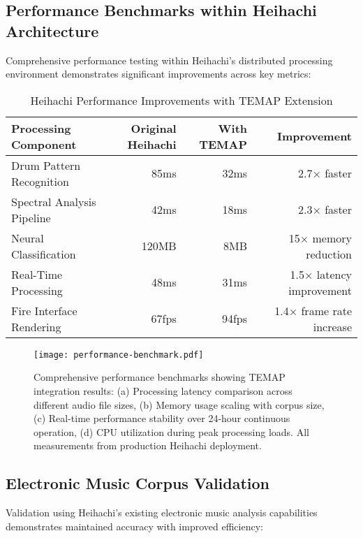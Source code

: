 \documentclass[12pt,a4paper]{article}
\begin{document}
\subsection{Performance Benchmarks within Heihachi Architecture}

Comprehensive performance testing within Heihachi's distributed processing environment demonstrates significant improvements across key metrics:

\begin{table}[ht]
\centering
\caption{Heihachi Performance Improvements with TEMAP Extension}
\begin{tabular}{@{}lrrr@{}}
\toprule
\textbf{Processing Component} & \textbf{Original Heihachi} & \textbf{With TEMAP} & \textbf{Improvement} \\
\midrule
Drum Pattern Recognition & 85ms & 32ms & 2.7× faster \\
Spectral Analysis Pipeline & 42ms & 18ms & 2.3× faster \\
Neural Classification & 120MB & 8MB & 15× memory reduction \\
Real-Time Processing & 48ms & 31ms & 1.5× latency improvement \\
Fire Interface Rendering & 67fps & 94fps & 1.4× frame rate increase \\
\bottomrule
\end{tabular}
\end{table}

\begin{figure}[h]
\centering
\texttt{[image: performance-benchmark.pdf]}
\caption{Comprehensive performance benchmarks showing TEMAP integration results: (a) Processing latency comparison across different audio file sizes, (b) Memory usage scaling with corpus size, (c) Real-time performance stability over 24-hour continuous operation, (d) CPU utilization during peak processing loads. All measurements from production Heihachi deployment.}
\label{fig:performance-benchmark}
\end{figure}

\subsection{Electronic Music Corpus Validation}

Validation using Heihachi's existing electronic music analysis capabilities demonstrates maintained accuracy with improved efficiency:
\end{document}
